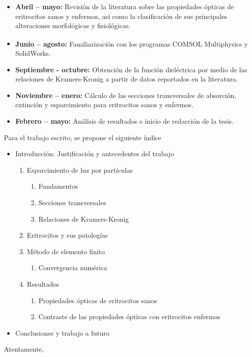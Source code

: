 \documentclass[11pt,letterpaper]{article}
\begin{document}
	\begin{itemize} 
		\item \textbf{Abril – mayo:} Revisión de la literatura sobre las propiedades ópticas de eritrocitos sanos y enfermos, así como la clasificación de sus principales alteraciones morfológicas y fisiológicas.
		\item \textbf{Junio – agosto:} Familiarización con los programas COMSOL Multiphysics\textsuperscript{\texttrademark} y SolidWorks. 
		
		\item \textbf{Septiembre - octubre:} Obtención de la función dieléctrica por medio de las relaciones de Kramers-Kronig a partir de datos reportados en la literatura.
		
		\item \textbf{Noviembre – enero:} Cálculo de las secciones transversales de absorción, extinción y esparcimiento para eritrocitos sanos y enfermos. 
		
		\item \textbf{Febrero – mayo:} Análisis de resultados e inicio de redacción de la tesis.
	\end{itemize}
	

	Para el trabajo escrito, se propone el siguiente índice
	\begin{itemize}
		\setlength\itemsep{0.05em}
		\item  Introducción: Justificación y antecedentes del trabajo
		\begin{enumerate}
			\item Esparcimiento de luz por partículas
			\begin{enumerate}[label=1.\arabic*]
				\item Fundamentos
				\item Secciones transversales
				\item Relaciones de Kramers-Kronig
			\end{enumerate}
			\item Eritrocitos y sus patologías
			\item Método de elemento finito
			\begin{enumerate}[label=3.\arabic*]
				\item Convergencia numérica 
			\end{enumerate}
			\item Resultados
			\begin{enumerate} [label=4.\arabic*]
				\item Propiedades ópticas de eritrocitos sanos
				\item  Contraste de las propiedades ópticas con eritrocitos enfermos
			\end{enumerate}
		\end{enumerate}	
		\item Conclusiones y trabajo a futuro	
	\end{itemize}
	Atentamente,
	
\end{document}
